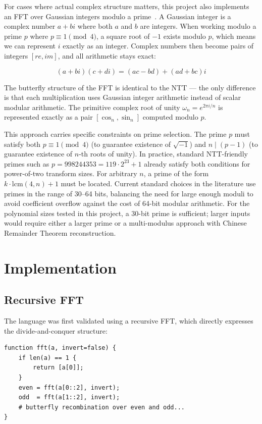 \documentclass[conference]{IEEEtran}
\begin{document}
For cases where actual complex structure matters, this project also implements an FFT over Gaussian integers modulo a prime~\cite{gaussian_fft}. A Gaussian integer is a complex number $a + bi$ where both $a$ and $b$ are integers. When working modulo a prime $p$ where $p \equiv 1 \pmod{4}$, a square root of $-1$ exists modulo $p$, which means we can represent $i$ exactly as an integer. Complex numbers then become pairs of integers $[re, im]$, and all arithmetic stays exact:

\begin{equation}
(a + bi)(c + di) = (ac - bd) + (ad + bc)i
\end{equation}

The butterfly structure of the FFT is identical to the NTT — the only difference is that each multiplication uses Gaussian integer arithmetic instead of scalar modular arithmetic. The primitive complex root of unity $\omega_n = e^{2\pi i/n}$ is represented exactly as a pair $[\cos_n, \sin_n]$ computed modulo $p$.

This approach carries specific constraints on prime selection. The prime $p$ must satisfy both $p \equiv 1 \pmod{4}$ (to guarantee existence of $\sqrt{-1}$) and $n \mid (p-1)$ (to guarantee existence of $n$-th roots of unity). In practice, standard NTT-friendly primes such as $p = 998244353 = 119 \cdot 2^{23} + 1$ already satisfy both conditions for power-of-two transform sizes. For arbitrary $n$, a prime of the form $k \cdot \text{lcm}(4, n) + 1$ must be located. Current standard choices in the literature use primes in the range of 30--64 bits, balancing the need for large enough moduli to avoid coefficient overflow against the cost of 64-bit modular arithmetic. For the polynomial sizes tested in this project, a 30-bit prime is sufficient; larger inputs would require either a larger prime or a multi-modulus approach with Chinese Remainder Theorem reconstruction.

\section{Implementation}

\subsection{Recursive FFT}

The language was first validated using a recursive FFT, which directly expresses the divide-and-conquer structure:

\begin{lstlisting}
function fft(a, invert=false) {
    if len(a) == 1 {
        return [a[0]];
    }
    even = fft(a[0::2], invert);
    odd  = fft(a[1::2], invert);
    # butterfly recombination over even and odd...
}
\end{lstlisting}
\end{document}
